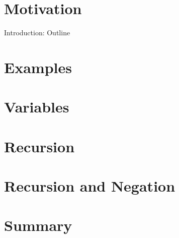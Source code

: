 \newcommand{\myinput}[1]{
\ifx\inlibrary\undefined
  
\else
  
\fi
}

\myinput{ezasp/macros}
\myinput{ezasp/summary}
\section{Motivation}
\myinput{ezasp/motivation}
\begin{frame}{Introduction: Outline}
  \medskip
  \tableofcontents
\end{frame}
\section{Examples}
\myinput{ezasp/example1}
\myinput{ezasp/example2}
\section{Variables}
\myinput{ezasp/example3}
\myinput{ezasp/example4}
\section{Recursion}
\myinput{ezasp/example5}
\myinput{ezasp/example6}
\myinput{ezasp/traveling}
\myinput{ezasp/oddeven}
\section{Recursion and Negation}
\myinput{ezasp/negative}
\section{Summary}
%
%
%
%
